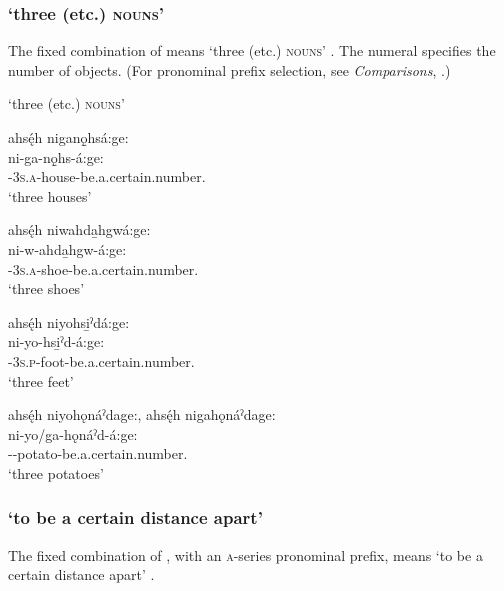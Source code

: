 \subsubsection*{ ‘three (etc.) \textsc{nouns}’} \label{Numeral + [ni-incorporated noun-age:]}
The fixed combination of  means ‘three (etc.) \textsc{nouns}’ . The numeral specifies the number of objects. (For pronominal prefix selection, see \textit{Comparisons}, .)

\ea\label{ex:pppexpressionex8}  ‘three (etc.) \textsc{nouns}’

\ea ahsę́h niganǫ̱hsá:ge:\\
\gll ni-ga-nǫ̱hs-á:ge:\\
{\partitive}-\textsc{3s.a}-house-be.a.certain.number.{\stative}\\
\glt `three houses'

\ex ahsę́h niwahda̱hgwá:ge:\\
\gll ni-w-ahda̱hgw-á:ge:\\
{\partitive}-\textsc{3s.a}-shoe-be.a.certain.number.{\stative}\\
\glt `three shoes'

\ex ahsę́h niyohsi̱ˀdá:ge:\\
\gll ni-yo-hsi̱ˀd-á:ge:\\
{\partitive}-\textsc{3s.p}-foot-be.a.certain.number.{\stative}\\
\glt `three feet'

\newpage

\ex ahsę́h niyohǫnáˀdage:, ahsę́h nigahǫnáˀdage:\\
\gll ni-yo/ga-hǫnáˀd-á:ge:\\
{\partitive}--potato-be.a.certain.number.{\stative}\\
\glt `three potatoes'
\z
\z


\subsubsection*{ ‘to be a certain distance apart’} \label{[naˀde-A-adreˀ]}
The fixed combination of , with an \textsc{a}-series pronominal prefix, means ‘to be a certain distance apart’ .


